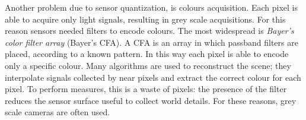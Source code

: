 Another problem due to sensor quantization, is colours acquisition. Each pixel is able to acquire only light signals, resulting in grey scale acquisitions. For this reason sensors needed filters to encode colours. The most widespread is \textit{Bayer's color filter array} (Bayer's \acs{CFA}). A \acs{CFA} is an array in which passband filters are placed, according to a known pattern. In this way each pixel is able to encode only a specific colour. Many algorithms are used to reconstruct the scene; they interpolate signals collected by near pixels and extract the correct colour for each pixel. To perform measures, this is a waste of pixels: the presence of the filter reduces the sensor surface useful to collect world details. For these reasons, grey scale cameras are often used.

